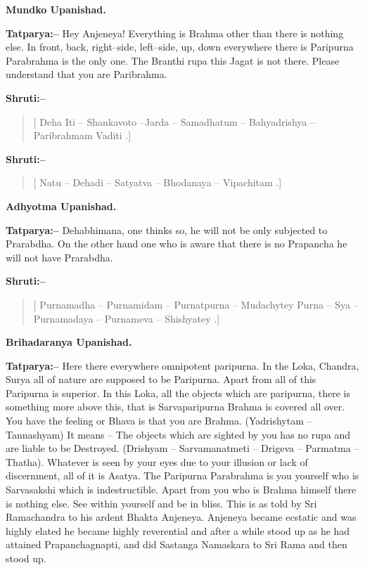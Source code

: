 \begin{flushright}
\textbf{Mundko Upanishad.}
\end{flushright}

\textbf{Tatparya:–} Hey Anjeneya! Everything is Brahma other than there is nothing else. In front, back, right–side, left–side, up, down everywhere there is Paripurna Parabrahma is the only one. The Branthi rupa this Jagat is not there. Please understand that you are Paribrahma.

\textbf{Shruti:–}

\begin{verse}
[ Deha Iti – Shankavoto –Jarda – Samadhatum – Bahyadrishya – Paribrahmam Vaditi .]
\end{verse}

\textbf{Shruti:–}

\begin{verse}
[ Natu – Dehadi – Satyatva – Bhodanaya – Vipachitam .]
\end{verse}

\begin{flushright}
\textbf{Adhyotma Upanishad.}
\end{flushright}

\textbf{Tatparya:–} Dehabhimana, one thinks so, he will not be only subjected to Prarabdha. On the other hand one who is aware that there is no Prapancha he will not have Prarabdha.

\textbf{Shruti:–}

\begin{verse}
[ Purnamadha – Purnamidam – Purnatpurna – Mudachytey  Purna – Sya – Purnamadaya – Purnameva – Shishyatey .]
\end{verse}

\begin{flushright}
\textbf{Brihadaranya Upanishad.}
\end{flushright}

\textbf{Tatparya:–} Here there everywhere omnipotent paripurna. In the Loka, Chandra, Surya all of nature are supposed to be Paripurna. Apart from all of this Paripurna is superior. In this Loka, all the objects which are paripurna, there is something more above this, that is Sarvaparipurna Brahma is covered all over. You have the feeling or Bhava is that you are Brahma. (Yadrishytam – Tannashyam) It means – The objects which are sighted by you has no rupa and are liable to be Destroyed. (Drishyam – Sarvamanatmeti – Drigeva – Parmatma – Thatha). Whatever is seen by your eyes due to your illusion or lack of discernment, all of it is Asatya. The Paripurna Parabrahma is you yourself who is Sarvasakshi which is indestructible. Apart from you who is Brahma himself there is nothing else. See within yourself and be in bliss. This is as told by Sri Ramachandra to his ardent Bhakta Anjeneya. Anjeneya became ecstatic and was highly elated he became highly reverential and after a while stood up as he had attained Prapanchagnapti, and did Sastanga Namaskara to Sri Rama and then stood up.


